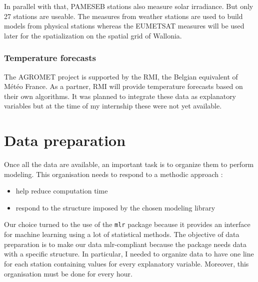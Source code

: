 \documentclass[12pt,twoside]{reedthesis}
\providecommand{\tightlist}{%
  \setlength{\itemsep}{0pt}\setlength{\parskip}{0pt}}
\theoremstyle{definition}
\theoremstyle{definition}
\theoremstyle{definition}
\theoremstyle{remark}
\begin{document}
In parallel with that, PAMESEB stations also measure solar irradiance.
But only 27 stations are useable. The measures from weather stations are
used to build models from physical stations whereas the EUMETSAT
measures will be used later for the spatialization on the spatial grid
of Wallonia.

\subsubsection{Temperature forecasts}\label{temperature-forecasts}

The AGROMET project is supported by the RMI, the Belgian equivalent of
Météo France. As a partner, RMI will provide temperature forecasts based
on their own algorithms. It was planned to integrate these data as
explanatory variables but at the time of my internship these were not
yet available.

\section{Data preparation}\label{data-preparation}

Once all the data are available, an important task is to organize them
to perform modeling. This organisation needs to respond to a methodic
approach :
\begin{itemize}
\tightlist
\item
  help reduce computation time
\item
  respond to the structure imposed by the chosen modeling library
\end{itemize}
Our choice turned to the use of the \texttt{mlr} package because it
provides an interface for machine learning using a lot of statistical
methods. The objective of data preparation is to make our data
mlr-compliant because the package needs data with a specific structure.
In particular, I needed to organize data to have one line for each
station containing values for every explanatory variable. Moreover, this
organisation must be done for every hour.
\end{document}
